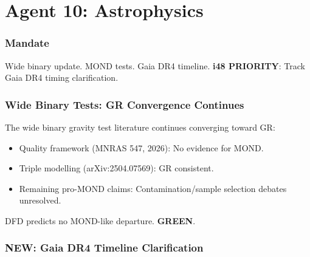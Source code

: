 \documentclass[11pt,a4paper]{article}
\newcommand{\GREEN}{\textcolor{dfdgreen}{\textbf{GREEN}}}
\newcommand{\NEW}{\textcolor{dfdblue}{\textbf{NEW}}}
\begin{document}
\part{Agent 10: Astrophysics}
\label{part:agent10}

\section{Mandate}

Wide binary update. MOND tests. Gaia DR4 timeline. \textbf{i48 PRIORITY}: Track Gaia DR4 timing clarification.

\section{Wide Binary Tests: GR Convergence Continues}

The wide binary gravity test literature continues converging toward GR:
\begin{itemize}
\item Quality framework (MNRAS 547, 2026): No evidence for MOND.
\item Triple modelling (arXiv:2504.07569): GR consistent.
\item Remaining pro-MOND claims: Contamination/sample selection debates unresolved.
\end{itemize}

DFD predicts no MOND-like departure. \GREEN.

\section{\NEW: Gaia DR4 Timeline Clarification}
\end{document}

